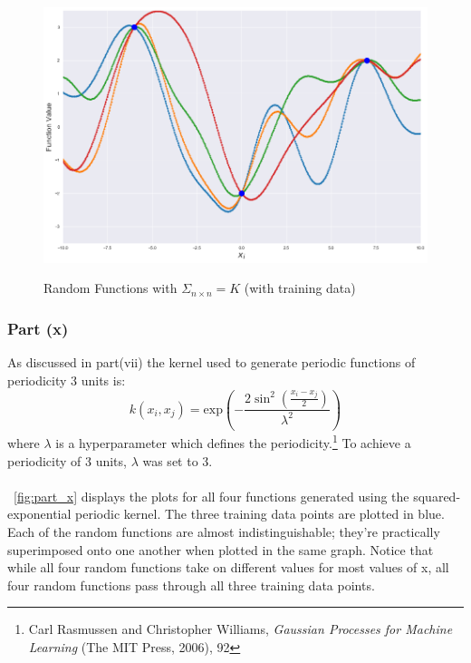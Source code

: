 \documentclass[twoside,11pt]{homework}
\DeclarePairedDelimiter{\2norm}{\lVert}{\rVert^2_2}
\newcommand{\1}[1]{\mathds{1}\left[#1\right]}
\begin{document}
\begin{figure}[H]
\centering
\caption{Random Functions with $\Sigma_{n \times n} = K$ (with training data)}
\includegraphics[scale=0.4]{"../code/figures/part_ix"}
\label{fig:part_ix}
\end{figure}


\vspace{0.15in}

\subsubsection*{Part (x)}
As discussed in part(vii) the kernel used to generate periodic functions of periodicity 3 units is: $$k(x_i, x_j) = \text{exp}\left(-\frac{2\sin^2\left(\frac{x_i-x_j}{2}\right)}{\lambda^2}\right)$$ where $\lambda$ is a hyperparameter which defines the periodicity.\footnote{Carl Rasmussen and Christopher Williams, \textit{Gaussian Processes for Machine Learning} (The MIT Press, 2006), 92} To achieve a periodicity of 3 units, $\lambda$ was set to 3. \\\ \\\
\autoref{fig:part_x} displays the plots for all four functions generated using the squared-exponential periodic kernel. 
The three training data points are plotted in blue. Each of the random functions are almost indistinguishable; they're practically superimposed onto one another when plotted in the same graph. Notice that while all four random functions take on different values for most values of x, all four random functions pass through all three training data points. 
\end{document}
